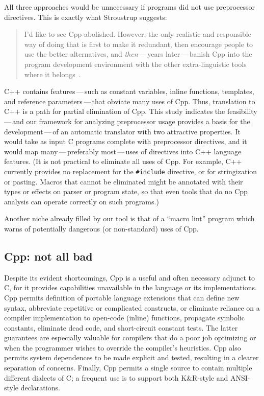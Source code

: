 \documentclass[11pt]{article}
\begin{document}
All three approaches would be unnecessary if programs did not use
preprocessor directives.  This is exactly what Stroustrup suggests:
\begin{quote}
  I'd like to see Cpp abolished.  However, the only realistic and
  responsible way of doing that is first to make it redundant, then
  encourage people to use the better alternatives, and {\em then\/}\,---\,years
  later\,---\,banish Cpp into the program development environment with the
  other extra-linguistic tools where it
  belongs~\cite[p.~426]{Stroustrup-DesignEvolution}.
\end{quote}
C++ contains features\,---\,such as constant variables, inline functions,
templates, and reference parameters\,---\,that obviate many uses of Cpp.
Thus, translation to C++ is a path for partial elimination of Cpp.
This study indicates the
feasibility\,---\,and our framework for analyzing preprocessor usage
provides a basis for the development\,---\,of an automatic translator with
two attractive properties.  It would take as input C programs complete with
preprocessor directives, and it would map many\,---\,preferably
most\,---\,uses of directives into C++ language features.  (It is not
practical to eliminate all uses of Cpp.  For example, C++ currently
provides no replacement for the {\tt \#include} directive, or for
stringization or pasting.  Macros that cannot be eliminated might be
annotated with their types or 
effects on parser or program state, so that even tools that do no Cpp
analysis can operate correctly on such programs.)

Another niche already filled by our tool is that of a ``macro lint''
program which warns of potentially dangerous (or non-standard) uses of Cpp.



\subsection{Cpp: not all bad}

Despite its evident shortcomings, Cpp is a useful and often necessary
adjunct to C, for it provides capabilities unavailable in the language or
its implementations.  Cpp permits definition of portable language
extensions that can define new syntax, abbreviate repetitive or complicated
constructs, or eliminate reliance on a compiler implementation to
open-code (inline) functions, propagate symbolic constants, eliminate dead
code, and short-circuit constant tests.  The latter guarantees are
especially valuable for compilers that do a poor job optimizing or when the
programmer wishes to override the compiler's heuristics.  Cpp also permits
system dependences to be made explicit and tested, resulting in a clearer
separation of concerns.  Finally, Cpp permits a single source to contain
multiple different dialects of C; a frequent use is to support both
K\&R-style and ANSI-style declarations.
\end{document}
